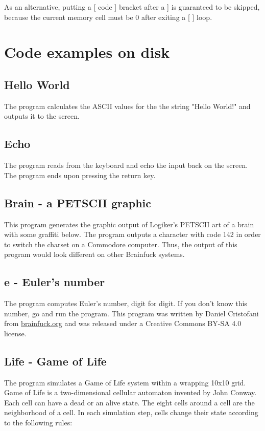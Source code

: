 \documentclass[ms,article,a4paper]{memoir}
\begin{document}
As an alternative, putting a [ code ] bracket after a ] is guaranteed to be skipped, because the current memory cell must be 0 after exiting a [ ] loop.

\section{Code examples on disk}

\subsection{Hello World}

The program calculates the ASCII values for the the string "Hello World!" and outputs it to the screen.

\subsection{Echo}

The program reads from the keyboard and echo the input back on the screen. The program ends upon pressing the return key.

\subsection{Brain - a PETSCII graphic}

This program generates the graphic output of Logiker's PETSCII art of a brain with some graffiti below. The program outputs a character with code 142 in order to switch the charset on a Commodore computer. Thus, the output of this program would look different on other Brainfuck systems.

\subsection{e - Euler's number}

The program computes Euler's number, digit for digit. If you don't know this number, go and run the program.
This program was written by Daniel Cristofani from \url{brainfuck.org} and was released under a Creative Commons BY-SA 4.0 license.

\subsection{Life - Game of Life}

The program simulates a Game of Life system within a wrapping 10x10 grid. Game of Life is a two-dimensional cellular automaton invented by John Conway. Each cell can have a dead or an alive state. The eight cells around a cell are the neighborhood of a cell.
In each simulation step, cells change their state according to the following rules:
\end{document}

